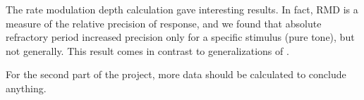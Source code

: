 The rate modulation depth calculation gave interesting results. 
In fact, RMD is a measure of the relative precision of response,
and we found that absolute refractory period increased precision only 
for a specific stimulus (pure tone), but not generally. 
This result comes in contrast to generalizations of \cite{BerryMeister}.

For the second part of the project, more data should be calculated to conclude anything.